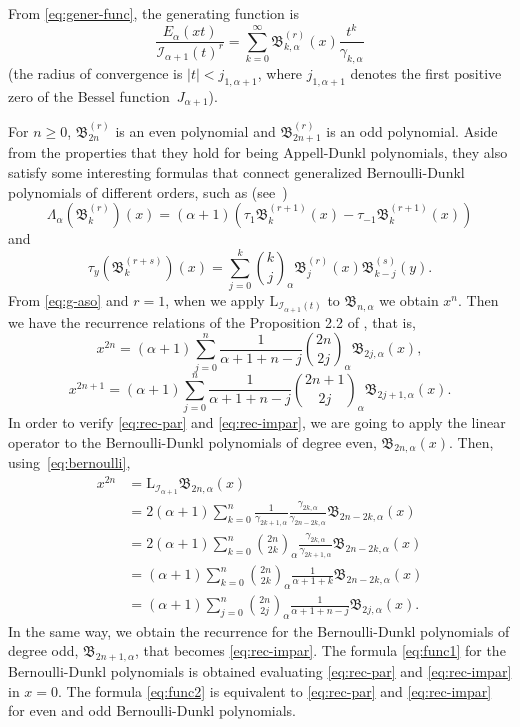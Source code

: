 \documentclass[11pt]{article}
\theoremstyle{plain}
\theoremstyle{remark}
\numberwithin{equation}{section} %
\newcommand{\Ea}{E_{\alpha}}
\newcommand{\binoma}[2]{\binom{#1}{#2}_{\!\alpha}}
\newcommand{\I}{\mathcal{I}}
\newcommand{\B}{\mathfrak{B}}
\newcommand{\LL}{\mathrm{L}}
\begin{document}
From \eqref{eq:gener-func}, the generating function is
\[
\frac{\Ea(xt)}{\I_{\alpha+1}(t)^r} 
= \sum_{k=0}^{\infty} {\B^{(r)}_{k,\alpha}(x)} \frac{t^k}{\gamma_{k,\alpha}}
\]
(the radius of convergence is $|t| < j_{1,\alpha+1}$, where $j_{1,\alpha+1}$ denotes the first positive zero of the Bessel function~$J_{\alpha+1}$).

For $n\geq 0$, $\B_{2n}^{(r)}$ is an even polynomial and $\B_{2n+1}^{(r)}$ is an odd polynomial. Aside from the properties that they hold for being Appell-Dunkl polynomials, they also satisfy some interesting formulas that connect generalized Bernoulli-Dunkl polynomials of different orders, such as (see~\cite{CMV})
\[
\Lambda_\alpha(\B_k^{(r)})(x) = (\alpha+1)(\tau_1\B_k^{(r+1)}(x) - \tau_{-1}\B_k^{(r+1)}(x))
\]
and
\[
\tau_y(\B_k^{(r+s)})(x) = \sum_{j=0}^{k}\binoma{k}{j} \B_j^{(r)}(x)\B_{k-j}^{(s)}(y).
\]
From \eqref{eq:g-aso} and $r=1$, when we apply $\LL_{\I_{\alpha+1}(t)}$ to $\B_{n,\alpha}$ we obtain $x^n$. 
Then we have the recurrence relations of the Proposition 2.2 of \cite{CDPV}, that is,
\begin{equation}
\label{eq:rec-par}
x^{2n} = (\alpha+1) \sum_{j=0}^n\frac{1}{\alpha+1+n-j} \binoma{2n}{2j} \B_{2j,\alpha}(x),
\end{equation}
\begin{equation}
\label{eq:rec-impar}
x^{2n+1} = (\alpha+1) \sum_{j=0}^{n}\frac{1}{\alpha+1+n-j} \binoma{2n+1}{2j} \B_{2j+1,\alpha}(x).
\end{equation}
In order to verify \eqref{eq:rec-par} and \eqref{eq:rec-impar}, we are going to apply the linear operator to the Bernoulli-Dunkl polynomials of degree even, $\B_{2n,\alpha}(x)$. Then, using~\eqref{eq:bernoulli},
\begin{align*}
x^{2n} &= \LL_{\I_{\alpha+1}}\B_{2n,\alpha}(x) \\
&= 2(\alpha+1)\sum_{k=0}^n \frac{1}{\gamma_{2k+1,\alpha}}
\frac{\gamma_{2k,\alpha}}{\gamma_{2n-2k,\alpha}} \B_{2n-2k,\alpha}(x)\\
&= 2(\alpha+1) \sum_{k=0}^n \binoma{2n}{2k} 
\frac{\gamma_{2k,\alpha}}{\gamma_{2k+1,\alpha}} \B_{2n-2k,\alpha}(x)\\
&= (\alpha+1)\sum_{k=0}^n \binoma{2n}{2k}\frac{1}{\alpha+1+k} \B_{2n-2k,\alpha}(x)\\
&= (\alpha+1)\sum_{j = 0}^n \binoma{2n}{2j}\frac{1}{\alpha+1+n-j} \B_{2j,\alpha}(x).
\end{align*}
In the same way, we obtain the recurrence for the Bernoulli-Dunkl polynomials of degree odd, $\B_{2n+1,\alpha}$, that becomes \eqref{eq:rec-impar}. The formula \eqref{eq:func1} for the Bernoulli-Dunkl polynomials is obtained evaluating \eqref{eq:rec-par} and \eqref{eq:rec-impar} in $x = 0$. The formula \eqref{eq:func2} is equivalent to \eqref{eq:rec-par} and \eqref{eq:rec-impar} for even and odd Bernoulli-Dunkl polynomials.
\end{document}
